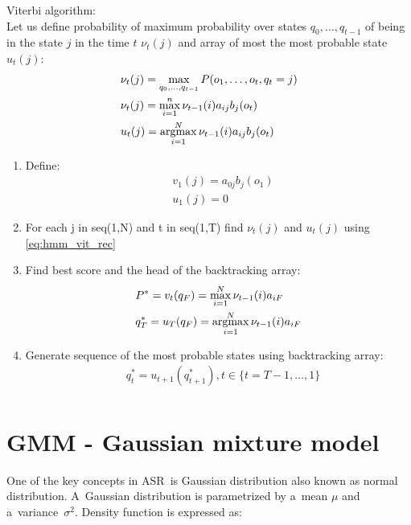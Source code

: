 \begin{algorithm} Viterbi algorithm: \\
	Let us define probability of maximum probability over states $q_0,\ldots,q_{t-1}$ of being in the state $j$ in the time $t$ $\nu_t(j)$ and array of most the most probable state $u_t(j)$:
	\begin{align}
		&\nu_t(j)=\max\limits_{q_0,\ldots,q_{t-1}} P(o_1,\ldots,o_t,q_t=j) \\
		\label{eq:hmm_vit_rec}
		&\nu_t(j)=\max\limits_{i=1}^{n} \nu_{t-1}(i)a_{ij}b_j(o_t) \\
		&u_t(j)=\operatorname*{argmax}\limits_{i=1}^{N} \nu_{t-1}(i)a_{ij}b_j(o_t)
	\end{align}

\begin{enumerate}
	\item Define: \\
		\begin{align}
			& v_1(j)=a_{0j}b_j(o_1) \\
			& u_1(j)=0
		\end{align}
	\item For each j in seq(1,N) and t in seq(1,T) find $\nu_t(j)$ and $u_t(j)$ using \eqref{eq:hmm_vit_rec} 
	\item Find best score and the head of the backtracking array:
		\begin{align}
			& P^{*}=v_t(q_F)=\max\limits_{i=1}^{N} \nu_{t-1}(i)a_{iF} \\
			& q_T^*=u_T(q_F)=\operatorname*{argmax}\limits_{i=1}^{N} \nu_{t-1}(i)a_{iF} 
		\end{align}
	\item Generate sequence of the most probable states using backtracking array:
		\begin{align}
			& q_t^*=u_{t+1}(q_{t+1}^*), t \in \{t=T-1,\ldots,1\} \\
		\end{align}
	
\end{enumerate}
	
\end{algorithm}


\section{GMM - Gaussian mixture model}

One of the key concepts in ASR~is Gaussian distribution \parencite{jurafsky} also known as normal distribution. A~Gaussian distribution is parametrized by a~mean $\mu $ and a~variance~$\sigma ^ 2$. Density function is expressed as:


